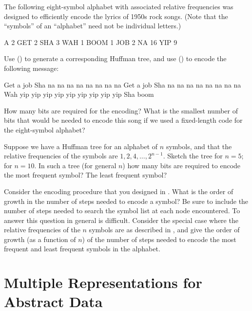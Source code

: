 \begin{exerciseGroup}
\label{Exercise 2.70}
 The following eight-symbol
alphabet with associated relative frequencies was designed to efficiently
encode the lyrics of 1950s rock songs.  (Note that the ``symbols'' of an
``alphabet'' need not be individual letters.)

\begin{example}
A    2   GET 2   SHA 3   WAH 1
BOOM 1   JOB 2   NA 16   YIP 9
\end{example}

Use  () to generate a
corresponding Huffman tree, and use  () to
encode the following message:

\begin{example}
Get a job
Sha na na na na na na na na
Get a job
Sha na na na na na na na na
Wah yip yip yip yip yip yip yip yip yip
Sha boom
\end{example}

How many bits are required for the encoding?  What is the smallest number of
bits that would be needed to encode this song if we used a fixed-length code
for the eight-symbol alphabet?

\label{Exercise 2.71}
 Suppose we have a Huffman tree
for an alphabet of \( n \) symbols, and that the relative frequencies of the
symbols are \( 1, 2, 4, \dots, 2^{n-1} \).  Sketch the tree for \( n=5 \); for
\( n=10 \).  In such a tree (for general \( n \)) how many bits are required to
encode the most frequent symbol?  The least frequent symbol?

\label{Exercise 2.72}
 Consider the encoding procedure
that you designed in .  What is the order of growth in the
number of steps needed to encode a symbol?  Be sure to include the number of
steps needed to search the symbol list at each node encountered.  To answer
this question in general is difficult.  Consider the special case where the
relative frequencies of the \( n \) symbols are as described in ,
and give the order of growth (as a function of \( n \)) of the number of
steps needed to encode the most frequent and least frequent symbols in the
alphabet.
\end{exerciseGroup}

\section{Multiple Representations for Abstract Data}
\label{Section 2.4}

